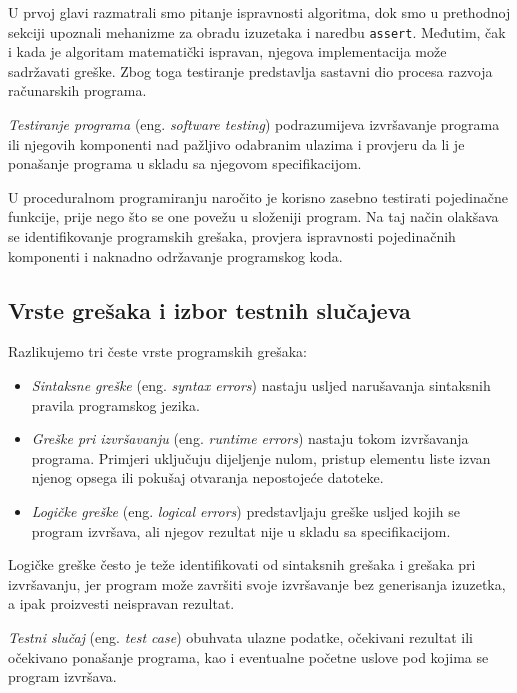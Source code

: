 U prvoj glavi razmatrali smo pitanje ispravnosti algoritma, 
dok smo u prethodnoj sekciji upoznali mehanizme za obradu 
izuzetaka i naredbu \texttt{assert}. Međutim, čak i kada je 
algoritam matematički ispravan, njegova implementacija može 
sadržavati greške. Zbog toga testiranje predstavlja sastavni 
dio procesa razvoja računarskih programa.

\textit{Testiranje programa} (eng. \emph{software testing}) 
podrazumijeva izvršavanje programa ili njegovih komponenti 
nad pažljivo odabranim ulazima i provjeru da li je ponašanje 
programa u skladu sa njegovom specifikacijom.

U proceduralnom programiranju naročito je korisno zasebno 
testirati pojedinačne funkcije, prije nego što se one povežu 
u složeniji program. Na taj način olakšava se identifikovanje 
programskih grešaka, provjera ispravnosti pojedinačnih 
komponenti i naknadno održavanje programskog koda.


\subsection{Vrste grešaka i izbor testnih slučajeva}

Razlikujemo tri česte vrste programskih grešaka:

\begin{itemize}
	\item \textit{Sintaksne greške} (eng. \emph{syntax errors}) 
	nastaju usljed narušavanja sintaksnih pravila programskog 
	jezika.
	
	\item \textit{Greške pri izvršavanju} (eng. 
	\emph{runtime errors}) nastaju tokom izvršavanja 
	programa. Primjeri uključuju dijeljenje nulom, pristup 
	elementu liste izvan njenog opsega ili pokušaj 
	otvaranja nepostojeće datoteke.
	
	\item \textit{Logičke greške} (eng. \emph{logical errors}) 
	predstavljaju greške usljed kojih se program izvršava, 
	ali njegov rezultat nije u skladu sa specifikacijom.
\end{itemize}

Logičke greške često je teže identifikovati od sintaksnih 
grešaka i grešaka pri izvršavanju, jer program može završiti 
svoje izvršavanje bez generisanja izuzetka, a ipak proizvesti 
neispravan rezultat.

\textit{Testni slučaj} (eng. \emph{test case}) obuhvata 
ulazne podatke, očekivani rezultat ili očekivano ponašanje 
programa, kao i eventualne početne uslove pod kojima se 
program izvršava.

